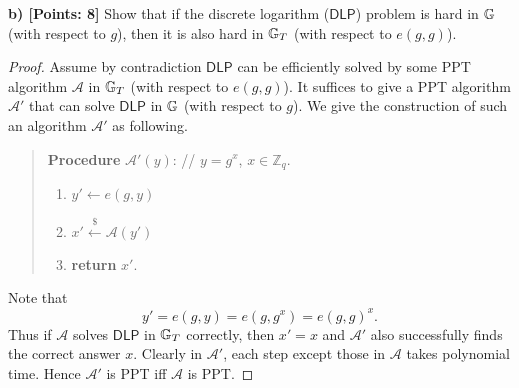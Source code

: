 \documentclass[12pt]{article}
\newcommand{\Z}{\mathbb{Z}}
\newcommand{\getsr}{\stackrel{\$}{\gets}}
\theoremstyle{definition}
\newcommand{\A}{\mathcal{A}}
\begin{document}
\newcommand{\DLP}{\textsf{DLP}}
{\bf b) [Points: 8]} Show that if the discrete logarithm ($\DLP$) problem is hard in $\mathbb{G}$ (with respect to $g$), then it is also hard in $\mathbb{G}_T$ (with respect to $e(g,g)$).
\begin{proof}
Assume by contradiction $\DLP$ can be efficiently solved by some PPT algorithm $\A$ in $\mathbb{G}_T$ (with respect to $e(g,g)$). It suffices to give a PPT algorithm $\A'$ that can solve $\DLP$ in $\mathbb{G}$ (with respect to $g$). We give the construction of such an algorithm $\A'$ as following.
\begin{quote}
{\bf Procedure} $\A'(y)$: // $y = g^x$, $x\in\Z_q$.
\begin{enumerate}
\item $y' \gets e(g,y)$
\item $x' \getsr \A(y')$
\item {\bf return} $x'$.
\end{enumerate}
\end{quote}
Note that 
$$y' = e(g,y) = e(g, g^x) = e(g,g)^x.$$
Thus if $\A$ solves $\DLP$ in $\mathbb{G}_T$ correctly, then $x'=x$ and $\A'$ also successfully finds the correct answer $x$. Clearly in $\A'$, each step except those in $\A$ takes polynomial time. Hence $\A'$ is PPT iff $\A$ is PPT. 
\end{proof}
\end{document}

